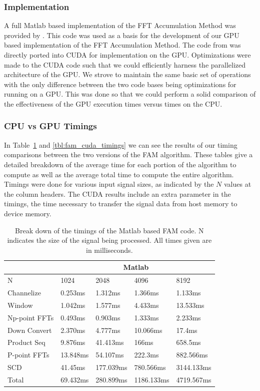 \subsubsection{Implementation}
A full Matlab based implementation of the FFT Accumulation Method was provided by \cite{Costa96}.  This code was used as a basis for the development of our GPU based implementation of the FFT Accumulation Method.  The code from \cite{Costa96} was directly ported into CUDA for implementation on the GPU.  Optimizations were made to the CUDA code such that we could efficiently harness the parallelized architecture of the GPU.  We strove to maintain the same basic set of operations with the only difference between the two code bases being optimizations for running on a GPU.  This was done so that we could perform a solid comparison of the effectiveness of the GPU execution times versus times on the CPU.

\subsubsection{CPU vs GPU Timings}
In Table~\ref{tbl:fam_matlab_timings} and \ref{tbl:fam_cuda_timings} we can see the results of our timing comparisons between the two versions of the FAM algorithm.  These tables give a detailed breakdown of the average time for each portion of the algorithm to compute as well as the average total time to compute the entire algorithm.  Timings were done for various input signal sizes, as indicated by the $N$ values at the column headers.  The CUDA results include an extra parameter in the timings, the time necessary to transfer the signal data from host memory to device memory.

\begin{table}
\begin{center}
\begin{tabular}{|l|l|l|l|l|}
\hline
 & \multicolumn{4}{|c|}{Matlab} \\
\hline
N & 1024 & 2048 & 4096 & 8192 \\
\hline
Channelize & 0.253ms & 1.312ms & 1.366ms & 1.133ms \\
Window & 1.042ms & 1.577ms & 4.433ms & 13.533ms \\
Np-point FFTs & 0.493ms & 0.903ms & 1.333ms & 2.233ms \\
Down Convert & 2.370ms & 4.777ms & 10.066ms & 17.4ms \\
Product Seq & 9.876ms & 41.413ms & 166ms & 658.5ms \\
P-point FFTs & 13.848ms & 54.107ms & 222.3ms & 882.566ms \\
SCD & 41.45ms & 177.039ms & 780.566ms & 3144.133ms \\
\hline
Total & 69.432ms & 280.899ms & 1186.133ms & 4719.567ms \\
\hline
\end{tabular}
\caption{Break down of the timings of the Matlab based FAM code.  N indicates the size of the signal being processed.  All times given are in milliseconds.}
\label{tbl:fam_matlab_timings}
\end{center}
\end{table}


